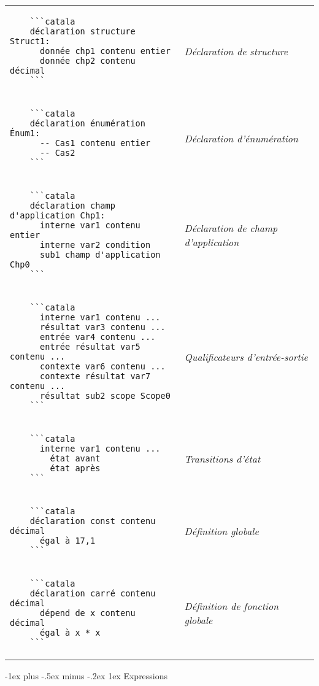\documentclass{article}
\makeatletter
\newcommand\articlenormalsize{\fontsize{10pt}{12pt}\selectfont}
\renewcommand{\section}{\@startsection{section}{1}{0mm}%
                                {-1ex plus -.5ex minus -.2ex}%
                                {1ex}%
                                {\normalfont\articlenormalsize\bfseries}}
\newenvironment{catala}{%
  \VerbatimEnvironment
  \let\FV@ListVSpace\relax
  \begin{verbatim}}%
 {\end{verbatim}}
\makeatother
\begin{document}
\begin{multicols}{3}
\begin{tabular}{@{}p{\cola}>{\slshape}p{\colb}@{}}
  
  \begin{catala}
    ```catala
    déclaration structure Struct1:
      donnée chp1 contenu entier
      donnée chp2 contenu décimal
    ```
  \end{catala}
  & Déclaration de structure
  \\
  \begin{catala}
    ```catala
    déclaration énumération Énum1:
      -- Cas1 contenu entier
      -- Cas2
    ```
  \end{catala}
  & Déclaration d'énumération
  \\
  \begin{catala}
    ```catala
    déclaration champ d'application Chp1:
      interne var1 contenu entier
      interne var2 condition
      sub1 champ d'application Chp0
    ```
  \end{catala}
  & Déclaration de champ d'application
  \\
  \begin{catala}
    ```catala
      interne var1 contenu ...
      résultat var3 contenu ...
      entrée var4 contenu ...
      entrée résultat var5 contenu ...
      contexte var6 contenu ...
      contexte résultat var7 contenu ...
      résultat sub2 scope Scope0
    ```
  \end{catala}
  & Qualificateurs d'entrée-sortie
  \\
  \begin{catala}
    ```catala
      interne var1 contenu ...
        état avant
        état après
    ```
  \end{catala}
  & Transitions d'état
  \\
  \begin{catala}
    ```catala
    déclaration const contenu décimal
      égal à 17,1
    ```
  \end{catala}
  & Définition globale
  \\
  \begin{catala}
    ```catala
    déclaration carré contenu décimal
      dépend de x contenu décimal
      égal à x * x
    ```
  \end{catala}
  & Définition de fonction globale
  \\
\end{tabular}

\section{Expressions}


\end{multicols}
\end{document}
